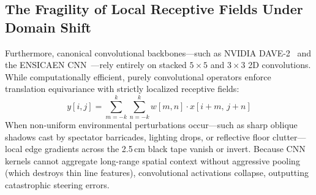 \documentclass[10pt,journal,compsoc]{IEEEtran}
\begin{document}
\subsection{The Fragility of Local Receptive Fields Under Domain Shift}
Furthermore, canonical convolutional backbones---such as NVIDIA DAVE-2~\cite{bojarski2016end} and the ENSICAEN CNN~\cite{palhano2026kart}---rely entirely on stacked $5 \times 5$ and $3 \times 3$ 2D convolutions. While computationally efficient, purely convolutional operators enforce translation equivariance with strictly localized receptive fields:
\begin{equation}
y[i, j] = \sum_{m=-k}^{k} \sum_{n=-k}^{k} w[m, n] \cdot x[i+m, \, j+n]
\end{equation}
When non-uniform environmental perturbations occur---such as sharp oblique shadows cast by spectator barricades, lighting drops, or reflective floor clutter---local edge gradients across the 2.5\,cm black tape vanish or invert. Because CNN kernels cannot aggregate long-range spatial context without aggressive pooling (which destroys thin line features), convolutional activations collapse, outputting catastrophic steering errors.
\end{document}
